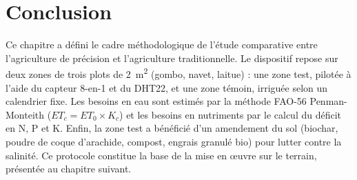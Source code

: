 \section{Conclusion}
Ce chapitre a défini le cadre méthodologique de l'étude comparative entre l'agriculture de précision et l'agriculture traditionnelle. Le dispositif repose sur deux zones de trois plots de 2~m\textsuperscript{2} (gombo, navet, laitue) : une zone test, pilotée à l'aide du capteur 8-en-1 et du DHT22, et une zone témoin, irriguée selon un calendrier fixe. Les besoins en eau sont estimés par la méthode FAO-56 Penman-Monteith ($ET_c = ET_0 \times K_c$) et les besoins en nutriments par le calcul du déficit en N, P et K. Enfin, la zone test a bénéficié d'un amendement du sol (biochar, poudre de coque d'arachide, compost, engrais granulé bio) pour lutter contre la salinité. Ce protocole constitue la base de la mise en œuvre sur le terrain, présentée au chapitre suivant.
